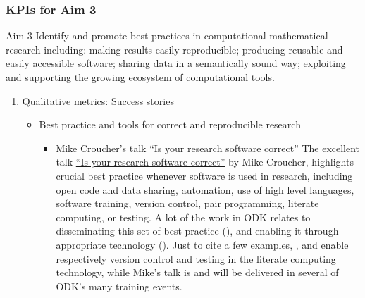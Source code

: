 \subsubsection{KPIs for Aim 3}

\begin{recommendation}{Aim 3}
  Identify and promote best practices in computational mathematical research including: making results easily reproducible; producing
  reusable and easily accessible software; sharing data in a semantically sound way; exploiting and supporting the growing
  ecosystem of computational tools.
\end{recommendation}

\begin{enumerate}
\item Qualitative metrics: Success stories
\begin{itemize}
\item Best practice and tools for correct and reproducible research
 \begin{itemize}       
\item Mike Croucher's talk ``Is your research software correct''
 The excellent talk \href{https://mikecroucher.github.io/MLPM_talk/}{``Is your research software correct''} by Mike 
 Croucher, highlights crucial best practice whenever software is used in research, including open code and data sharing, 
 automation, use of high level languages, software training, version control, pair programming, literate computing, or testing. A 
 lot of the work in ODK relates to disseminating this set of best practice (), and enabling it through appropriate 
 technology ().  Just to cite a few examples, , and  
 enable respectively version control and testing in the \Jupyter literate computing technology, while Mike's talk is and will be 
 delivered in several of ODK's many training events.
         

\end{itemize}
\end{itemize}
\end{enumerate}
